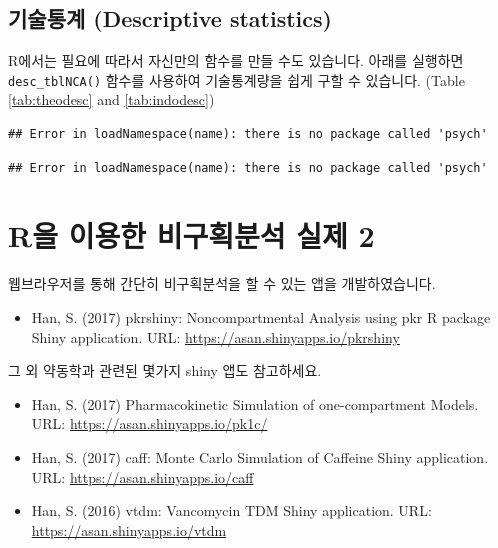 \documentclass[
  11pt,
  krantz2, a4paper, twoside]{krantz}
\providecommand{\tightlist}{%
  \setlength{\itemsep}{0pt}\setlength{\parskip}{0pt}}
\begin{document}
\hypertarget{uxae30uxc220uxd1b5uxacc4-descriptive-statistics}{%
\subsection{기술통계 (Descriptive statistics)}\label{uxae30uxc220uxd1b5uxacc4-descriptive-statistics}}

R에서는 필요에 따라서 자신만의 함수를 만들 수도 있습니다.
아래를 실행하면 \texttt{desc\_tblNCA()} 함수를 사용하여 기술통계량을 쉽게 구할 수 있습니다. (Table \ref{tab:theodesc} and \ref{tab:indodesc})

\begin{verbatim}
## Error in loadNamespace(name): there is no package called 'psych'
\end{verbatim}

\begin{verbatim}
## Error in loadNamespace(name): there is no package called 'psych'
\end{verbatim}

\hypertarget{ruxc744-uxc774uxc6a9uxd55c-uxbe44uxad6cuxd68duxbd84uxc11d-uxc2e4uxc81c-2}{%
\section{R을 이용한 비구획분석 실제 2}\label{ruxc744-uxc774uxc6a9uxd55c-uxbe44uxad6cuxd68duxbd84uxc11d-uxc2e4uxc81c-2}}

웹브라우저를 통해 간단히 비구획분석을 할 수 있는 앱을 개발하였습니다.

\begin{itemize}
\tightlist
\item
  Han, S. (2017) pkrshiny: Noncompartmental Analysis using pkr R package Shiny application. URL: \url{https://asan.shinyapps.io/pkrshiny}
\end{itemize}

그 외 약동학과 관련된 몇가지 shiny 앱도 참고하세요.

\begin{itemize}
\tightlist
\item
  Han, S. (2017) Pharmacokinetic Simulation of one-compartment Models. URL: \url{https://asan.shinyapps.io/pk1c/}
\item
  Han, S. (2017) caff: Monte Carlo Simulation of Caffeine Shiny application. URL: \url{https://asan.shinyapps.io/caff}
\item
  Han, S. (2016) vtdm: Vancomycin TDM Shiny application. URL: \url{https://asan.shinyapps.io/vtdm}
\end{itemize}
\end{document}
